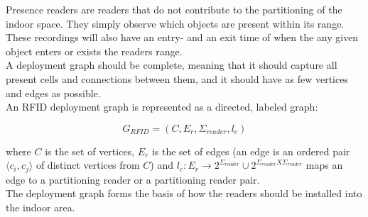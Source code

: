 Presence readers are readers that do not contribute to the partitioning of the indoor space. 
They simply observe which objects are present within its range. 
These recordings will also have an entry- and an exit time of when the any given object enters or exists the readers range. \\

A deployment graph should be complete, meaning that it should capture all present cells and connections between them, and it should have as few vertices and edges as possible. \\

An RFID deployment graph is represented as a directed, labeled graph:

\begin{equation}
G_{RFID} = (C, E_r, \Sigma_{reader}, l_e)
\end{equation} 

where $C$ is the set of vertices, $E_r$ is the set of edges (an edge is an ordered pair $\langle c_i, c_j \rangle$ of distinct vertices from $C$) and $l_e : E_r \rightarrow 2^{\Sigma_{reader}} \cup 2^{\Sigma_{reader} X \Sigma_{reader}}$ maps an edge to a partitioning reader or a partitioning reader pair. \\

The deployment graph forms the basis of how the readers should be installed into the indoor area. 

